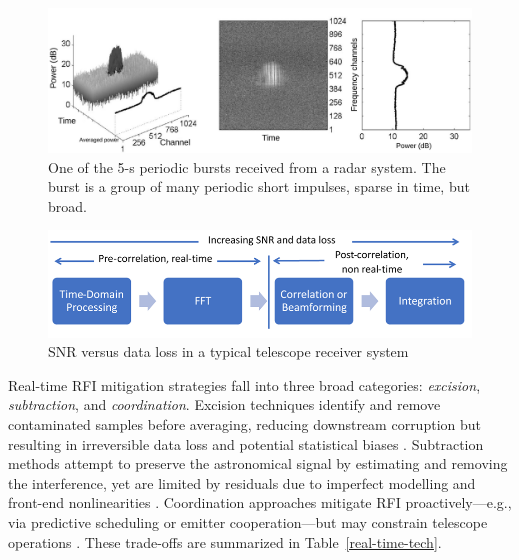 \begin{figure}
    \centering
    \includegraphics[height=.20\textheight]{figures/radar.pdf}
    \caption{One of the 5-s periodic bursts received from a radar system.  The burst is a group of many periodic short impulses, sparse in time, but broad.  }
    \label{fig:rfi_example_radar}
\end{figure}

\begin{figure}
    \centering
    \includegraphics[scale=0.8]{Hardware Excision Techniques/figures/rt.jpg}
    \caption{SNR versus data loss in a typical telescope receiver system}
    \label{fig:real-time-rfi}
\end{figure}

Real-time RFI mitigation strategies fall into three broad categories: \textit{excision}, \textit{subtraction}, and \textit{coordination}. Excision techniques identify and remove contaminated samples before averaging, reducing downstream corruption but resulting in irreversible data loss and potential statistical biases \citep{hugo2022tricolouroptimizedsumthresholdflagger,10464448}. Subtraction methods attempt to preserve the astronomical signal by estimating and removing the interference, yet are limited by residuals due to imperfect modelling and front-end nonlinearities \citep{ellingson2022coherent,chakraborty2024low}. Coordination approaches mitigate RFI proactively—e.g., via predictive scheduling or emitter cooperation—but may constrain telescope operations \citep{hellbourg2024assessing}. These trade-offs are summarized in Table~\ref{real-time-tech}.



